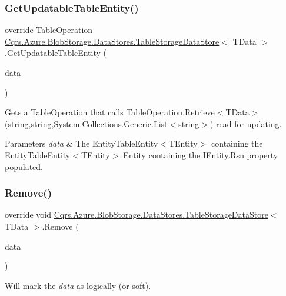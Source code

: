 \subsubsection{\texorpdfstring{Get\+Updatable\+Table\+Entity()}{GetUpdatableTableEntity()}\hspace{0.1cm}{\footnotesize\ttfamily [2/2]}}
{\footnotesize\ttfamily override Table\+Operation \hyperlink{classCqrs_1_1Azure_1_1BlobStorage_1_1DataStores_1_1TableStorageDataStore}{Cqrs.\+Azure.\+Blob\+Storage.\+Data\+Stores.\+Table\+Storage\+Data\+Store}$<$ T\+Data $>$.Get\+Updatable\+Table\+Entity (\begin{DoxyParamCaption}\item[{\hyperlink{classCqrs_1_1Azure_1_1BlobStorage_1_1EntityTableEntity}{Entity\+Table\+Entity}$<$ T\+Data $>$}]{data }\end{DoxyParamCaption})\hspace{0.3cm}{\ttfamily [protected]}}



Gets a Table\+Operation that calls Table\+Operation.\+Retrieve$<$\+T\+Data$>$(string,string,\+System.\+Collections.\+Generic.\+List$<$string$>$) read for updating. 


\begin{DoxyParams}{Parameters}
{\em data} & The Entity\+Table\+Entity$<$\+T\+Entity$>$ containing the \hyperlink{classCqrs_1_1Azure_1_1BlobStorage_1_1EntityTableEntity_ac1f795a5b8c45645ebc71bcde126bcb5_ac1f795a5b8c45645ebc71bcde126bcb5}{Entity\+Table\+Entity$<$\+T\+Entity$>$.\+Entity} containing the I\+Entity.\+Rsn property populated.\\
\hline
\end{DoxyParams}
\mbox{\label{classCqrs_1_1Azure_1_1BlobStorage_1_1DataStores_1_1TableStorageDataStore_a724d1188cdac6a7bfe7c753480f0c09a_a724d1188cdac6a7bfe7c753480f0c09a}} 
\subsubsection{\texorpdfstring{Remove()}{Remove()}}
{\footnotesize\ttfamily override void \hyperlink{classCqrs_1_1Azure_1_1BlobStorage_1_1DataStores_1_1TableStorageDataStore}{Cqrs.\+Azure.\+Blob\+Storage.\+Data\+Stores.\+Table\+Storage\+Data\+Store}$<$ T\+Data $>$.Remove (\begin{DoxyParamCaption}\item[{T\+Data}]{data }\end{DoxyParamCaption})}



Will mark the {\itshape data}  as logically (or soft). 

